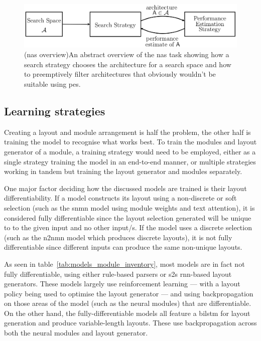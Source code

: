 \begin{figure}[htbp]
    \centering
    \includegraphics[width=\textwidth,keepaspectratio]{content/chapters/literature_review/discussion/figures/neural_architecture_search_overview.png}
    \captionsource(\acrshort{nas} overview){An abstract overview of the \acrshort{nas} task showing how a search strategy chooses the architecture for a search space and how to preemptively filter architectures that obviously wouldn't be suitable using \acrshort{pes}.\label{fig:neural_architecture_search_overview}}{\citeauthor{elsken_neural_2019}\cite{elsken_neural_2019}}
\end{figure}

\subsection{Learning strategies}
\label{subsec:learning_strategies}

Creating a layout and module arrangement is half the problem, the other half is training the model to recognise what works best.
To train the modules and layout generator of a module, a training strategy would need to be employed, either as a single strategy training the model in an end-to-end manner, or multiple strategies working in tandem but training the layout generator and modules separately.

One major factor deciding how the discussed models are trained is their layout differentiability.
If a model constructs its layout using a non-discrete or soft selection (such as the \gls{snmn} model using module weights and text attention), it is considered fully differentiable since the layout selection generated will be unique to to the given input and no other input/s.
If the model uses a discrete selection (such as the \gls{n2nmn} model which produces discrete layouts), it is not fully differentiable since different inputs can produce the same non-unique layouts.

As seen in table~\ref{tab:models_module_inventory}, most models are in fact not fully differentiable, using either rule-based parsers\cite{andreas_neural_2016,chen_meta_2020} or \gls{s2s} \gls{rnn}-based layout generators\cite{hu_learning_2017,chen_teaching_2022,su_toward_2020,kottur_visual_2018,cho_visual_2021}.
These models largely use reinforcement learning --- with a layout policy being used to optimise the layout generator --- and using backpropagation on those areas of the model (such as the neural modules) that are differentiable.
On the other hand, the fully-differentiable models all feature a \gls{bilstm} for layout generation and produce variable-length layouts\cite{hudson_compositional_2018}.
These use backpropagation across both the neural modules and layout generator.

